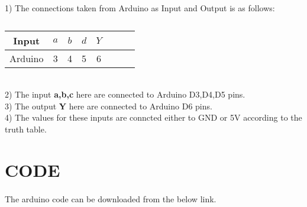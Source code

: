 \documentclass[a4paper,11pt,twocolumn]{article}
\begin{document}
1) The connections taken from Arduino as Input and Output is as follows:
\begin{table}[ht!] 
    \centering 
    \begin{tabular}{|c|c|c|c|c|c|c|c|} 
    \hline 
       Input & $a$&$b$&$d$&$Y$\\ 
       \hline 
    Arduino & 3&4&5&6\\ 
    \hline 
    \end{tabular} 
    \caption{} 
\end{table} 
\\
2) The  input \textbf{a,b,c} here are connected to Arduino D3,D4,D5 pins.\\
3) The  output \textbf{Y} here are connected to Arduino D6 pins.\\
4) The values for these inputs are conncted either to GND or 5V according to the truth table.\\
\section{CODE}
\paragraph{}
	The arduino code can be downloaded from the below link.
\begin{center} 
\end{center}
\end{document}
